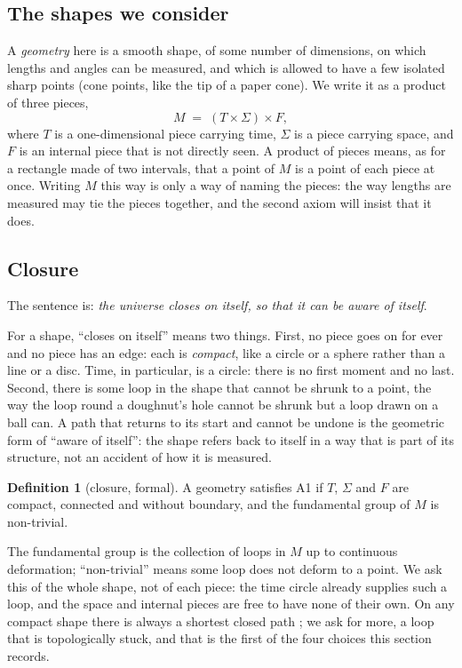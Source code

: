 \documentclass[11pt,a4paper]{article}
\theoremstyle{plain}
\theoremstyle{definition}
\newtheorem{definition}[theorem]{Definition}
\theoremstyle{remark}
\begin{document}
\subsection{The shapes we consider}

A \emph{geometry} here is a smooth shape, of some number of dimensions, on which lengths and angles can be measured, and which is allowed to have a few isolated sharp points (cone points, like the tip of a paper cone). We write it as a product of three pieces,
\begin{equation}\label{eq:family}
M \;=\; (T \times \Sigma) \times F ,
\end{equation}
where $T$ is a one-dimensional piece carrying time, $\Sigma$ is a piece carrying space, and $F$ is an internal piece that is not directly seen. A product of pieces means, as for a rectangle made of two intervals, that a point of $M$ is a point of each piece at once. Writing $M$ this way is only a way of naming the pieces: the way lengths are measured may tie the pieces together, and the second axiom will insist that it does.

\subsection{Closure}\label{sec:A1}

The sentence is: \emph{the universe closes on itself, so that it can be aware of itself}.

For a shape, ``closes on itself'' means two things. First, no piece goes on for ever and no piece has an edge: each is \emph{compact}, like a circle or a sphere rather than a line or a disc. Time, in particular, is a circle: there is no first moment and no last. Second, there is some loop in the shape that cannot be shrunk to a point, the way the loop round a doughnut's hole cannot be shrunk but a loop drawn on a ball can. A path that returns to its start and cannot be undone is the geometric form of ``aware of itself'': the shape refers back to itself in a way that is part of its structure, not an accident of how it is measured.

\begin{definition}[closure, formal]\label{def:A1}
A geometry satisfies A1 if $T$, $\Sigma$ and $F$ are compact, connected and without boundary, and the fundamental group of $M$ is non-trivial.
\end{definition}

The fundamental group is the collection of loops in $M$ up to continuous deformation; ``non-trivial'' means some loop does not deform to a point. We ask this of the whole shape, not of each piece: the time circle already supplies such a loop, and the space and internal pieces are free to have none of their own. On any compact shape there is always a shortest closed path \cite{LyusternikFet}; we ask for more, a loop that is topologically stuck, and that is the first of the four choices this section records.
\end{document}
